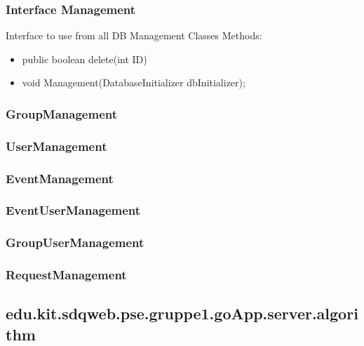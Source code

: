 	\subsubsection{Interface Management}
	Interface to use from all DB Management Classes
	\newline Methods:
	\begin{itemize} 
		\item public boolean delete(int ID)			
		
		\item void Management(DatabaseInitializer dbInitializer);
	\end{itemize}
	\subsubsection{GroupManagement}
	\subsubsection{UserManagement}
	\subsubsection{EventManagement}
	\subsubsection{EventUserManagement}
	\subsubsection{GroupUserManagement}
	\subsubsection{RequestManagement}
  
  
  	\subsection{edu.kit.sdqweb.pse.gruppe1.goApp.server.algorithm}
	
